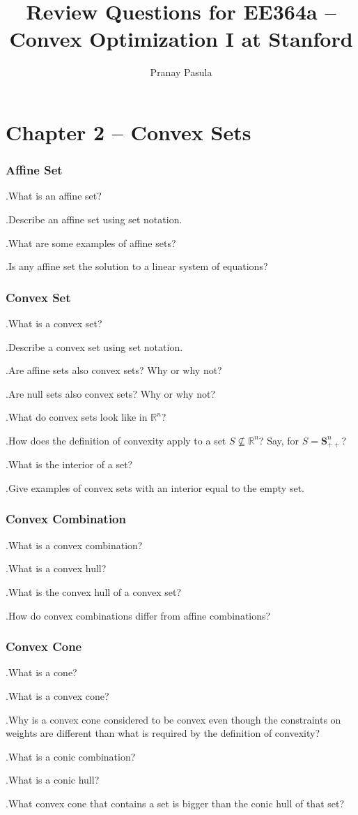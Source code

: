 \documentclass[]{article}
\title{Review Questions for EE364a -- Convex Optimization I at Stanford}
\author{Pranay Pasula}
\newcommand{\Rn}{\mathbb{R}^{n}}
\newcommand{\Snpp}{\boldsymbol{S}^{n}_{++}}
\newcounter{q}
\newcommand{\qnum}{\addtocounter{q}{1}\theq.\quad}
\begin{document}
\maketitle

\section*{Chapter 2 -- Convex Sets}

\subsubsection*{Affine Set}
\qnum What is an affine set? \\
\qnum Describe an affine set using set notation. \\
\qnum What are some examples of affine sets? \\
\qnum Is any affine set the solution to a linear system of equations?

\subsubsection*{Convex Set}
\qnum What is a convex set? \\
\qnum Describe a convex set using set notation. \\
\qnum Are affine sets also convex sets? Why or why not? \\
\qnum Are null sets also convex sets? Why or why not? \\
\qnum What do convex sets look like in $\Rn$? \\
\qnum How does the definition of convexity apply to a set $S \nsubseteq \Rn$? Say, for $S = \Snpp$? \\
\qnum What is the interior of a set? \\
\qnum Give examples of convex sets with an interior equal to the empty set.

\subsubsection*{Convex Combination}
\qnum What is a convex combination? \\
\qnum What is a convex hull? \\
\qnum What is the convex hull of a convex set? \\
\qnum How do convex combinations differ from affine combinations?

\subsubsection*{Convex Cone}
\qnum What is a cone? \\
\qnum What is a convex cone? \\
\qnum Why is a convex cone considered to be convex even though the constraints on weights are different than what is required by the definition of convexity? \\
\qnum What is a conic combination? \\
\qnum What is a conic hull?
\qnum What convex cone that contains a set is bigger than the conic hull of that set?
\end{document}
